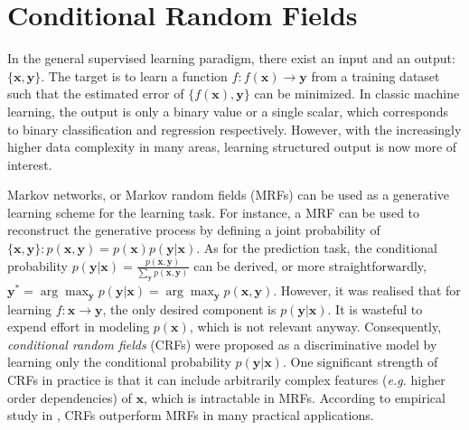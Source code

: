 \section{Conditional Random Fields}
\label{sec:crf}
In the general supervised learning paradigm, there exist an input and an output: $\{\mathbf{x},\mathbf{y}\}$. The target is to learn a function       
$f:f(\mathbf{x})\rightarrow \mathbf{y}$ from a training dataset such that the estimated error of $\{f(\mathbf{x}),\mathbf{y}\}$ can be minimized.     
In classic machine learning, the output is only a binary value or a single scalar, which corresponds to binary classification and regression respectively.      
However, with the increasingly higher data complexity in many areas, learning structured output is now more of interest.        

Markov networks, or Markov random fields (MRFs) can be used as a generative learning scheme for the learning task.    
For instance, a MRF can be used to 
reconstruct the generative process by defining a joint probability of $\{\mathbf{x,y}\}: p(\mathbf{x,y})=p(\mathbf{x})p(\mathbf{y}|\mathbf{x})$. 
As for the prediction task, the conditional probability 
$p(\mathbf{y|x})=\frac{p(\mathbf{x,y})}{\sum_\mathbf{y} p(\mathbf{x,y})}$ can be derived, or more straightforwardly, 
$\mathbf{y}^*=\arg\max_{\mathbf{y}}p(\mathbf{y|x})=\arg\max_{\mathbf{y}}p(\mathbf{x,y})$. 
However, it was realised that for learning $f:\mathbf{x}\to\mathbf{y}$, the only desired
component is $p(\mathbf{y|x})$. It is wasteful to expend effort in modeling $p(\mathbf{x})$, which is not relevant anyway. Consequently, \emph{conditional random fields} (CRFs) were proposed \citep{CRF} as 
a discriminative model by learning only the conditional probability $p(\mathbf{y|x})$. One significant strength of CRFs in practice is that it can include arbitrarily complex features (\emph{e.g.} higher order dependencies) 
of $\mathbf{x}$, which is intractable in MRFs. According to empirical study in \cite{Kumar03,CRF}, CRFs outperform MRFs in many practical applications. 

